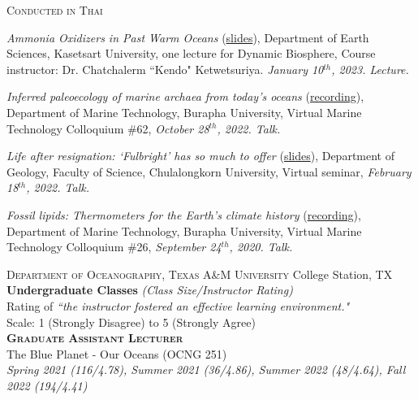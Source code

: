 \documentclass[10pt]{article}
\newcommand{\margintext}[1]{\marginnote{\normalsize\textbf #1 |}}
\begin{document}
\textsc{Conducted in Thai}
\begin{etaremune}
\item \textit{Ammonia Oxidizers in Past Warm Oceans} (\href{https://tamucs-my.sharepoint.com/:b:/g/personal/rrattan_tamu_edu/ESdkQzE0k-xNufbKOW7oMxwBUtcPdXOOMauWxMsfEqFgkA?e=Xk2nDl}{slides}), Department of Earth Sciences, Kasetsart University, one lecture for Dynamic Biosphere, Course instructor: Dr. Chatchalerm ``Kendo" Ketwetsuriya. \textit{January 10$^{th}$, 2023. Lecture.}

\item \textit{Inferred paleoecology of marine archaea from today's oceans} (\href{https://fb.watch/grZcLZQSbV/}{recording}), Department of Marine Technology, Burapha University, Virtual Marine Technology Colloquium \#62, \textit{October 28$^{th}$, 2022. Talk.}

\item \textit{Life after resignation: `Fulbright' has so much to offer} (\href{https://www.canva.com/design/DAE4hfYUXJk/3E9PACt31gAkqAKfjnURkg/edit?utm_content=DAE4hfYUXJk&utm_campaign=designshare&utm_medium=link2&utm_source=sharebutton}{slides}), Department of Geology, Faculty of Science, Chulalongkorn University, Virtual seminar, \textit{February 18$^{th}$, 2022. Talk.}

\item \textit{Fossil lipids: Thermometers for the Earth's climate history} (\href{https://www.facebook.com/watch/?v=405982837057621}{recording}), Department of Marine Technology, Burapha University, Virtual Marine Technology Colloquium \#26, \textit{September 24$^{th}$, 2020. Talk.}

\end{etaremune}

\bigskip
\margintext{Teaching}
\textsc{Department of Oceanography, Texas A\&M University} \hfill College Station, TX \\
\textbf{Undergraduate Classes} \textit{(Class Size/Instructor Rating)} \\
\footnotesize 
Rating of \textit{``the instructor fostered an effective learning environment."}\\
Scale: 1 (Strongly Disagree) to 5 (Strongly Agree) \\

\normalsize
\textbf{\textsc{Graduate Assistant Lecturer}} \\
The Blue Planet - Our Oceans (OCNG 251) \\
\textit{Spring 2021 (116/4.78), Summer 2021 (36/4.86), Summer 2022 (48/4.64), Fall 2022 (194/4.41)}
\end{document}
